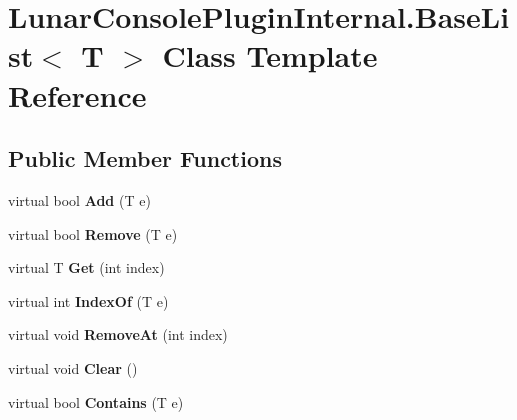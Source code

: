 \hypertarget{class_lunar_console_plugin_internal_1_1_base_list}{}\section{Lunar\+Console\+Plugin\+Internal.\+Base\+List$<$ T $>$ Class Template Reference}
\label{class_lunar_console_plugin_internal_1_1_base_list}
\subsection*{Public Member Functions}
\begin{DoxyCompactItemize}
\item 
\mbox{\label{class_lunar_console_plugin_internal_1_1_base_list_a7cccaf4607fb7274d96f4dbc40900bbb}} 
virtual bool {\bfseries Add} (T e)
\item 
\mbox{\label{class_lunar_console_plugin_internal_1_1_base_list_a443eb0a3c752c4eab1c03a06d248e513}} 
virtual bool {\bfseries Remove} (T e)
\item 
\mbox{\label{class_lunar_console_plugin_internal_1_1_base_list_a4680c836cf0118f87109b5c1f8af0f87}} 
virtual T {\bfseries Get} (int index)
\item 
\mbox{\label{class_lunar_console_plugin_internal_1_1_base_list_a23fe33696953c7e838727480b4bacdb7}} 
virtual int {\bfseries Index\+Of} (T e)
\item 
\mbox{\label{class_lunar_console_plugin_internal_1_1_base_list_ad757240af5220661b607fa30484c591a}} 
virtual void {\bfseries Remove\+At} (int index)
\item 
\mbox{\label{class_lunar_console_plugin_internal_1_1_base_list_a1aba064bd36e334bbc467028eb66849e}} 
virtual void {\bfseries Clear} ()
\item 
\mbox{\label{class_lunar_console_plugin_internal_1_1_base_list_ac97ca602850defb07bea283d04055d89}} 
virtual bool {\bfseries Contains} (T e)
\end{DoxyCompactItemize}
